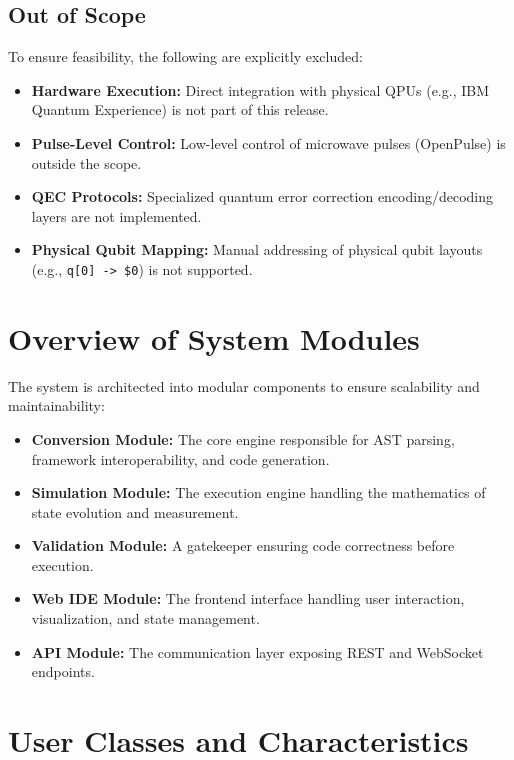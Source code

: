 \subsection{Out of Scope}

To ensure feasibility, the following are explicitly excluded:
\begin{itemize}
    \item \textbf{Hardware Execution:} Direct integration with physical QPUs (e.g., IBM Quantum Experience) is not part of this release.
    \item \textbf{Pulse-Level Control:} Low-level control of microwave pulses (OpenPulse) is outside the scope.
    \item \textbf{QEC Protocols:} Specialized quantum error correction encoding/decoding layers are not implemented.
    \item \textbf{Physical Qubit Mapping:} Manual addressing of physical qubit layouts (e.g., \texttt{q[0] -> \$0}) is not supported.
\end{itemize}

\section{Overview of System Modules}

The system is architected into modular components to ensure scalability and maintainability:

\begin{itemize}
    \item \textbf{Conversion Module:} The core engine responsible for AST parsing, framework interoperability, and code generation.
    \item \textbf{Simulation Module:} The execution engine handling the mathematics of state evolution and measurement.
    \item \textbf{Validation Module:} A gatekeeper ensuring code correctness before execution.
    \item \textbf{Web IDE Module:} The frontend interface handling user interaction, visualization, and state management.
    \item \textbf{API Module:} The communication layer exposing REST and WebSocket endpoints.
\end{itemize}

\section{User Classes and Characteristics}

